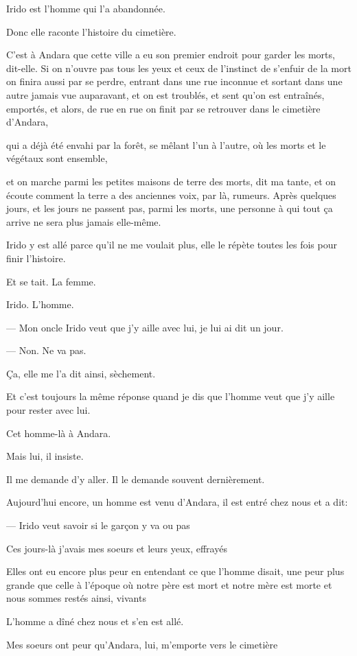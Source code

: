 Irido est l'homme qui l'a abandonnée.

Donc elle raconte l'histoire du cimetière.

C'est à Andara que cette ville a eu son premier endroit pour garder les
morts, dit-elle. Si on n'ouvre pas tous les yeux et ceux de l'instinct
de s'enfuir de la mort on finira aussi par se perdre, entrant dans une
rue inconnue et sortant dans une autre jamais vue auparavant, et on est
troublés, et sent qu'on est entraînés, emportés, et alors, de rue en rue
on finit par se retrouver dans le cimetière d'Andara,

qui a déjà été envahi par la forêt, se mêlant l'un à l'autre, où les
morts et le végétaux sont ensemble,

et on marche parmi les petites maisons de terre des morts, dit ma tante,
et on écoute comment la terre a des anciennes voix, par là, rumeurs.
Après quelques jours, et les jours ne passent pas, parmi les morts, une
personne à qui tout ça arrive ne sera plus jamais elle-même.

Irido y est allé parce qu'il ne me voulait plus, elle le répète toutes
les fois pour finir l'histoire.

Et se tait. La femme.

Irido. L'homme.

--- Mon oncle Irido veut que j'y aille avec lui, je lui ai dit un jour.

--- Non. Ne va pas.

Ça, elle me l'a dit ainsi, sèchement.

Et c'est toujours la même réponse quand je dis que l'homme veut que j'y
aille pour rester avec lui.

Cet homme-là à Andara.

Mais lui, il insiste.

Il me demande d'y aller. Il le demande souvent dernièrement.

Aujourd'hui encore, un homme est venu d'Andara, il est entré chez nous
et a dit:

--- Irido veut savoir si le garçon y va ou pas

Ces jours-là j'avais mes soeurs et leurs yeux, effrayés

Elles ont eu encore plus peur en entendant ce que l'homme disait, une
peur plus grande que celle à l'époque où notre père est mort et notre
mère est morte et nous sommes restés ainsi, vivants

L'homme a dîné chez nous et s'en est allé.

Mes soeurs ont peur qu'Andara, lui, m'emporte vers le cimetière

